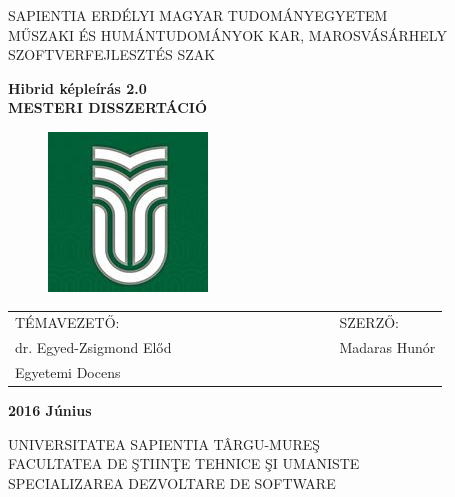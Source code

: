 \documentclass[12pt, a4paper, oneside]{book}
\theoremstyle{tetel}
\begin{document}

\newpage
\thispagestyle{empty}
\begin{center}
    \Large SAPIENTIA ERDÉLYI MAGYAR TUDOMÁNYEGYETEM\\
    \Large MŰSZAKI ÉS HUMÁNTUDOMÁNYOK KAR, MAROSVÁSÁRHELY\\
    \Large SZOFTVERFEJLESZTÉS SZAK\\
\end{center}

\begin{center}
 	\vspace{2cm}\LARGE \textbf{Hibrid képleírás 2.0}\\
	 \vspace{1cm}\LARGE \textbf{MESTERI DISSZERTÁCIÓ}\\
\end{center}

\vspace{2cm}
\begin{figure}[htb]
\hspace{5.7cm}\includegraphics[bb = 0 0 160 160]{sapi.jpg}
\end{figure}

\vspace{2cm}
\begin{center}
\begin{tabular}{lcccccccccccl}
    TÉMAVEZETŐ:&&&&&&& &&&&&SZERZŐ:\\
     dr. Egyed-Zsigmond Előd&&&&&& &&&&&&Madaras Hunór\\
	Egyetemi Docens
\end{tabular}
\end{center}

\begin{center}
    \vspace{0.5cm}\textbf{2016 Június}
\end{center}
\vspace*{\fill}
\newpage
\thispagestyle{empty}
\begin{center}
    \Large UNIVERSITATEA SAPIENTIA TÂRGU-MURE\c{S}\\
    \Large FACULTATEA DE \c{S}TIIN\c{T}E TEHNICE \c{S}I UMANISTE\\
    \Large SPECIALIZAREA DEZVOLTARE DE SOFTWARE\\
\end{center}
\end{document}

